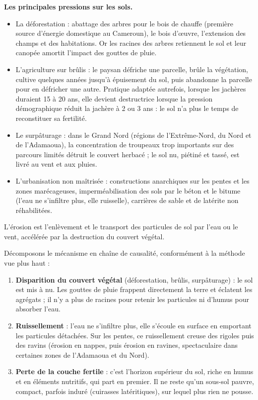 \documentclass[11pt]{article}
\newcommand{\cle}[1]{{\popxbold\color{popdark}#1}}
\newcounter{popsec}
\newcounter{popsub}
\newcommand{\courssub}[1]{%
  \stepcounter{popsub}%
  \par\vspace{9pt}\noindent{\popxbold\fontsize{11.5}{13}\selectfont\color{popink}{\color{poporange}\thepopsec.\thepopsub}\hspace{6pt}#1}\par\nopagebreak\vspace{4pt}
}
\begin{document}
\textbf{Les principales pressions sur les sols.}\par
\begin{itemize}
\item La \cle{déforestation} : abattage des arbres pour le bois de chauffe (première source d'énergie domestique au Cameroun), le bois d'œuvre, l'extension des champs et des habitations. Or les racines des arbres retiennent le sol et leur canopée amortit l'impact des gouttes de pluie.
\item L'\cle{agriculture sur brûlis} : le paysan défriche une parcelle, brûle la végétation, cultive quelques années jusqu'à épuisement du sol, puis abandonne la parcelle pour en défricher une autre. Pratique adaptée autrefois, lorsque les jachères duraient 15 à 20 ans, elle devient destructrice lorsque la pression démographique réduit la jachère à 2 ou 3 ans : le sol n'a plus le temps de reconstituer sa fertilité.
\item Le \cle{surpâturage} : dans le Grand Nord (régions de l'Extrême-Nord, du Nord et de l'Adamaoua), la concentration de troupeaux trop importants sur des parcours limités détruit le couvert herbacé ; le sol nu, piétiné et tassé, est livré au vent et aux pluies.
\item L'\cle{urbanisation non maîtrisée} : constructions anarchiques sur les pentes et les zones marécageuses, imperméabilisation des sols par le béton et le bitume (l'eau ne s'infiltre plus, elle ruisselle), carrières de sable et de latérite non réhabilitées.
\end{itemize}

\courssub{Le mécanisme de l'érosion}

\begin{definition}[L'érosion]
L'\cle{érosion} est l'enlèvement et le transport des particules de sol par l'eau ou le vent, accélérée par la destruction du couvert végétal.
\end{definition}

Décomposons le mécanisme en chaîne de causalité, conformément à la méthode vue plus haut :

\begin{enumerate}
\item \textbf{Disparition du couvert végétal} (déforestation, brûlis, surpâturage) : le sol est mis à nu. Les gouttes de pluie frappent directement la terre et éclatent les agrégats ; il n'y a plus de racines pour retenir les particules ni d'humus pour absorber l'eau.
\item \textbf{Ruissellement} : l'eau ne s'infiltre plus, elle s'écoule en surface en emportant les particules détachées. Sur les pentes, ce ruissellement creuse des rigoles puis des ravins (érosion en nappes, puis érosion en ravines, spectaculaire dans certaines zones de l'Adamaoua et du Nord).
\item \textbf{Perte de la couche fertile} : c'est l'horizon supérieur du sol, riche en humus et en éléments nutritifs, qui part en premier. Il ne reste qu'un sous-sol pauvre, compact, parfois induré (cuirasses latéritiques), sur lequel plus rien ne pousse.
\end{enumerate}
\end{document}
